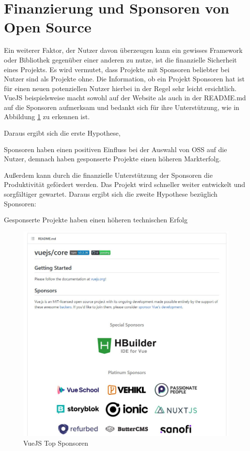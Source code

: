 \section{Finanzierung und Sponsoren von Open Source}

Ein weiterer Faktor, der Nutzer davon überzeugen kann ein gewisses Framework oder Bibliothek 
gegenüber einer anderen zu nutze, ist die finanzielle Sicherheit eines Projekts. Es wird vermutet,
dass Projekte mit Sponsoren beliebter bei Nutzer sind als Projekte ohne.
Die Information, ob ein Projekt Sponsoren hat ist für einen neuen potenziellen Nutzer hierbei in der
Regel sehr leicht ersichtlich. 
VueJS beispielsweise macht sowohl auf der Website als auch in der README.md auf die Sponsoren aufmerksam
und bedankt sich für ihre Unterstützung, wie in Abbildung \ref{abb:VueJS_Sponsors} zu erkennen ist.

Daraus ergibt sich die erste Hypothese,

\begin{hypothesis}
    Sponsoren haben einen positiven Einfluss bei der Auswahl von OSS auf die Nutzer, demnach haben
    gesponserte Projekte einen höheren Markterfolg.   
\end{hypothesis}

Außerdem kann durch die finanzielle Unterstützung der Sponsoren die Produktivität gefördert werden.
Das Projekt wird schneller weiter entwickelt und sorgfältiger gewartet. Daraus ergibt sich die 
zweite Hypothese bezüglich Sponsoren:

\begin{hypothesis}
    Gesponserte Projekte haben einen höheren technischen Erfolg
\end{hypothesis}

\begin{figure}[h]
    \centering
    \includegraphics[scale=0.6]{figures/02/VueSponsoren.JPG}
    \caption{VueJS Top Sponsoren}
    \label{abb:VueJS_Sponsors}
\end{figure}
